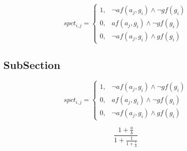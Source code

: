 \documentclass[a4paper]{article}
\begin{document}
\begin{equation}
spct_{i,j} =
\begin{cases}
1, & \text{$\neg af(a_j,g_i) \wedge \neg gf(g_i)$}\\
0, & \text{$af(a_j,g_i) \wedge \neg gf(g_i)$}\\
0, & \text{$\neg af(a_j,g_i) \wedge gf(g_i)$}
\end{cases}
\end{equation}

\subsection{SubSection}

\begin{equation}
spct_{i,j} =
\begin{cases}
1, & \text{$\neg af(a_j,g_i) \wedge \neg gf(g_i)$}\\
0, & \text{$af(a_j,g_i) \wedge \neg gf(g_i)$}\\
0, & \text{$\neg af(a_j,g_i) \wedge gf(g_i)$}
\end{cases}
\end{equation}

\[ \frac{1+\frac{a}{b}}{1+\frac{1}{1+\frac{1}{a}}} \]
\end{document}
